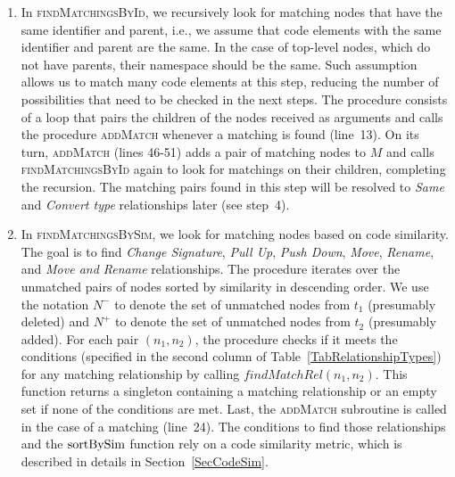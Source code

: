 \begin{enumerate}

\item In \textsc{findMatchingsById}, we recursively look for matching nodes that have the same identifier and parent, i.e., we assume that code elements with the same identifier and parent are the same. In the case of top-level nodes, which do not have parents, their namespace should be the same.
Such assumption allows us to match many code elements at this step, reducing the number of possibilities that need to be checked in the next steps.
The procedure consists of a loop that pairs the children of the nodes received as arguments and calls the procedure \textsc{addMatch} whenever a matching is found (line~13).
On its turn, \textsc{addMatch} (lines 46-51) adds a pair of matching nodes to $M$ and calls \textsc{findMatchingsById} again to look for matchings on their children, completing the recursion.
The matching pairs found in this step will be resolved to \textit{Same} and \textit{Convert type} relationships later (see step~4).

\item In \textsc{findMatchingsBySim}, we look for matching nodes based on code similarity.
The goal is to find \textit{Change Signature}, \textit{Pull Up}, \textit{Push Down}, \textit{Move}, \textit{Rename}, and \textit{Move and Rename} relationships.
The procedure iterates over the unmatched pairs of nodes sorted by similarity in descending order.
We use the notation $N^-$ to denote the set of unmatched nodes from $t_1$ (presumably deleted) and $N^+$ to denote the set of unmatched nodes from $t_2$ (presumably added).
For each pair $(n_1, n_2)$, the procedure checks if it meets the conditions (specified in the second column of Table~\ref{TabRelationshipTypes}) for any matching relationship by calling $\mathit{findMatchRel}(n_1, n_2)$.
This function returns a singleton containing a matching relationship or an empty set if none of the conditions are met.
Last, the \textsc{addMatch} subroutine is called in the case of a matching (line~24).
The conditions to find those relationships and the $\operatorname{sortBySim}$ function rely on a code similarity metric, which is described in details in Section~\ref{SecCodeSim}.


\end{enumerate}
